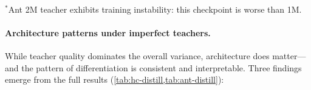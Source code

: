 \begin{table}[ht]
\centering
\caption{Ant-POMDP: student return (mean $\pm$ std). $\dagger$ = 5 seeds; all others 3 seeds. Random baseline: $-69 \pm 109$. On Ant, MLP and FrameStack are competitive with temporal models---memory provides only modest benefit.}
\label{tab:ant-distill}
\\[4pt]
{\small $^*$Ant 2M teacher exhibits training instability: this checkpoint is worse than 1M.}
\end{table}


\paragraph{Architecture patterns under imperfect teachers.}
\label{sec:arch-patterns}

While teacher quality dominates the overall variance, architecture does matter---and the pattern of differentiation is consistent and interpretable.
Three findings emerge from the full results (\cref{tab:hc-distill,tab:ant-distill}):

